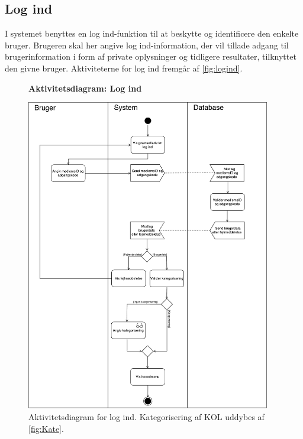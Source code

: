 \subsection*{Log ind}
I systemet benyttes en log ind-funktion til at beskytte og identificere den enkelte bruger. Brugeren skal her angive log ind-information, der vil tillade adgang til brugerinformation i form af private oplysninger og tidligere resultater, tilknyttet den givne bruger. Aktiviteterne for log ind fremgår af \autoref{fig:logind}.    

\begin{figure} [H]
\centering
\textbf{Aktivitetsdiagram: Log ind}\par\medskip
\includegraphics[width=0.95\textwidth]{figures/aktivitetsdiagram/Logind}
\caption{Aktivitetsdiagram for log ind. Kategorisering af KOL uddybes af \autoref{fig:Kate}.}
\label{fig:logind}
\end{figure}

